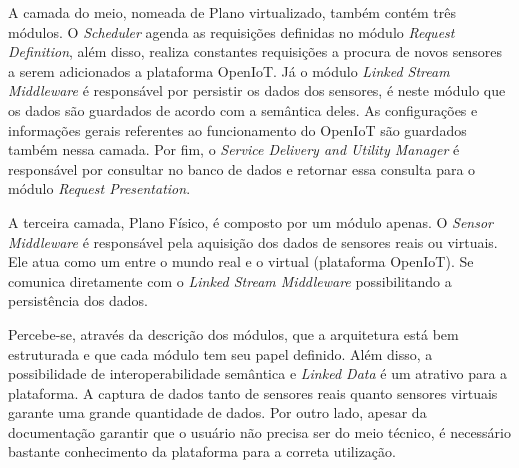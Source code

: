 A camada do meio, nomeada de Plano virtualizado, também contém três módulos. O
\textit{Scheduler} agenda as requisições definidas no módulo \textit{Request
Definition}, além disso, realiza constantes requisições a procura de novos
sensores a serem adicionados a plataforma OpenIoT. Já o módulo \textit{Linked
Stream Middleware} é responsável por persistir os dados dos sensores, é neste
módulo que os dados são guardados de acordo com a semântica deles.
As configurações e informações gerais referentes ao
funcionamento do OpenIoT são guardados também nessa camada. Por fim, o
\textit{Service Delivery and Utility Manager} é responsável por consultar no
banco de dados e retornar essa consulta para o módulo \textit{Request
Presentation}.

A terceira camada, Plano Físico, é composto por um módulo apenas. O \textit{Sensor
Middleware} é responsável pela aquisição dos dados de sensores reais ou
virtuais. Ele atua como um \gateway[] entre o mundo real e o virtual (plataforma
OpenIoT). Se comunica diretamente com o \textit{Linked Stream Middleware}
possibilitando a persistência dos dados.

Percebe-se, através da descrição dos módulos, que a arquitetura está bem
estruturada e que cada módulo tem seu papel definido. Além disso, a
possibilidade de interoperabilidade semântica e \textit{Linked Data} é um
atrativo para a plataforma. A captura de dados tanto de sensores reais quanto
sensores virtuais garante uma grande quantidade de dados. Por outro lado,
apesar da documentação garantir que o usuário não precisa ser do meio técnico,
é necessário bastante conhecimento da plataforma para a correta utilização. 























